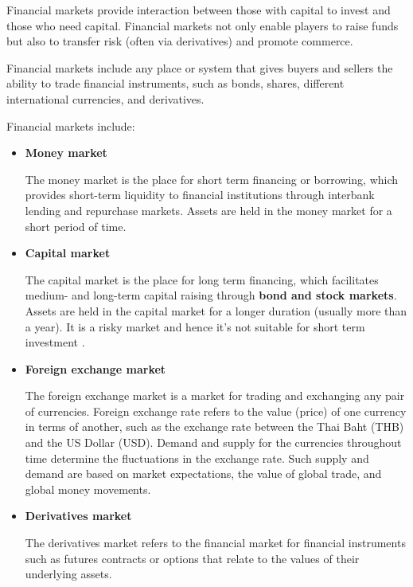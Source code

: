 \documentclass[landscape, 20pt]{extreport}
\theoremstyle{definition}
\theoremstyle{definition}
\theoremstyle{definition}
\theoremstyle{definition}
\theoremstyle{remark}
\begin{document}
Financial markets provide interaction between those with capital to
invest and those who need capital. Financial markets not only enable
players to raise funds but also to transfer risk (often via derivatives)
and promote commerce.

Financial markets include any place or system that gives buyers and
sellers the ability to trade financial instruments, such as bonds,
shares, different international currencies, and derivatives.

Financial markets include:

\begin{itemize}
    \item \textbf{Money market}
    
The money market is the place for short term financing or borrowing,
which provides short-term liquidity to financial institutions through
interbank lending and repurchase markets. Assets are held in the money
market for a short period of time.

    \item  \textbf{Capital market} 
    
The capital market is the place for long term financing, which
facilitates medium- and long-term capital raising through \textbf{bond and stock
markets}. Assets are held in the capital market for a longer duration
(usually more than a year). It is a risky market and hence it's not
suitable for short term investment .

    \item \textbf{Foreign exchange market}
    

The foreign exchange market is a market for trading and exchanging any
pair of currencies. Foreign exchange rate refers to the value (price) of
one currency in terms of another, such as the exchange rate between the
Thai Baht (THB) and the US Dollar (USD). Demand and supply for the
currencies throughout time determine the fluctuations in the exchange
rate. Such supply and demand are based on market expectations, the value
of global trade, and global money movements.

    \item \textbf{Derivatives market}
    


The derivatives market refers to the financial market for financial
instruments such as futures contracts or options that relate to the
values of their underlying assets.

\end{itemize}
\end{document}

